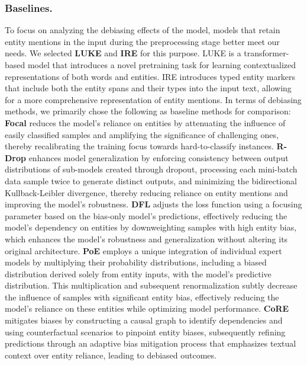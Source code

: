 \documentclass[letterpaper]{article} %
\begin{document}
\subsubsection{Baselines.} 
To focus on analyzing the debiasing effects of the model, models that retain entity mentions in the input during the preprocessing stage better meet our needs. We selected \textbf{LUKE} \cite{yamada2020luke} and \textbf{IRE} \cite{zhou2022improved} for this purpose. LUKE is a transformer-based model that introduces a novel pretraining task for learning contextualized representations of both words and entities. IRE introduces typed entity markers that include both the entity spans and their types into the input text, allowing for a more comprehensive representation of entity mentions. In terms of debiasing methods, we primarily chose the following as baseline methods for comparison: \textbf{Focal} \cite{lin2018focal} reduces the model's reliance on entities by attenuating the influence of easily classified samples and amplifying the significance of challenging ones, thereby recalibrating the training focus towards hard-to-classify instances. \textbf{R-Drop} \cite{liang2021r} enhances model generalization by enforcing consistency between output distributions of sub-models created through dropout, processing each mini-batch data sample twice to generate distinct outputs, and minimizing the bidirectional Kullback-Leibler divergence, thereby reducing reliance on entity mentions and improving the model's robustness. \textbf{DFL} \cite{mahabadi2020end} adjusts the loss function using a focusing parameter based on the bias-only model's predictions, effectively reducing the model's dependency on entities by downweighting samples with high entity bias, which enhances the model's robustness and generalization without altering its original architecture. \textbf{PoE} \cite{hinton2002training} employs a unique integration of individual expert models by multiplying their probability distributions, including a biased distribution derived solely from entity inputs, with the model's predictive distribution. This multiplication and subsequent renormalization subtly decrease the influence of samples with significant entity bias, effectively reducing the model's reliance on these entities while optimizing model performance. \textbf{CoRE} \cite{wang2022should} mitigates biases by constructing a causal graph to identify dependencies and using counterfactual scenarios to pinpoint entity biases, subsequently refining predictions through an adaptive bias mitigation process that emphasizes textual context over entity reliance, leading to debiased outcomes.
\end{document}
